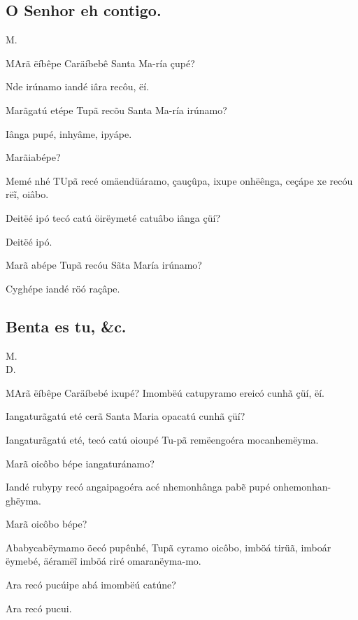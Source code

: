\documentclass[openany,titlepage,12pt]{book}
\newcommand{\comecalista}[5]{
    \hspace*{-11.7pt}
    \begin{minipage}[t]{0.08\linewidth}
        \flushright #1\\#2
    \end{minipage}
    \hspace{0pt}
    \begin{minipage}[t]{0.94\linewidth}
        \lettrine
        [findent =2pt, nindent=0pt,  lines=2]
        {#3}{#4}#5
    \end{minipage}
    \vspace*{-3pt}
}
\begin{document}
\subsection{O Senhor eh contigo.}
\vspace*{-2pt}
\comecalista{M.}{}{M}{A}
    {rã ëíbêpe Caräíbebê Santa Ma-ría çupé?}
\begin{altereven}
    \item Nde irúnamo iandé iâra recôu, ëí.
    \item Marãgatú etépe Tupã recõu Santa Ma-ría irúnamo?
    \item Iânga pupé, inhyâme, ipyápe.
    \item Marãiabépe?
    \item Memé nhé TUpã recé omäendüáramo, çauçûpa, ixupe
    onhëênga, ceçápe xe recóu rëĩ, oiâbo.
    \item Deitëé ipó tecó catú öirëymeté catuâbo iânga çüí?
    \item Deitëé ipó.
    \item Marã abépe Tupã recóu Sãta María irúnamo?
    \item Cyghépe iandé röó raçâpe.
\end{altereven}
\subsection{Benta es tu, \&c.}
\vspace*{-2pt}
\comecalista{M.}{D.}{M}{A}
    {rã ëíbêpe Caräíbebé ixupé?
    Imombëú catupyramo ereicó cunhã çüí, ëí.}
\begin{alternate}
    \item Iangaturãgatú eté cerã Santa Maria opacatú cunhã çüí?
    \item Iangaturãgatú eté, tecó catú oioupé Tu-pã
    remëengoéra mocanhemëyma.
    \item Marã oicôbo bépe iangaturánamo?
    \item Iandé rubypy recó angaipagoéra acé\linebreak
    nhemonhânga pabẽ pupé onhemonhan-ghëyma.
    \item Marã oicôbo bépe?
    \item Ababycabëymamo öecó pupênhé, Tupã cyramo 
    oicôbo, imböá tirüã, imboár ëymebé, äéramëĩ imböá riré
    omaranëyma-mo.
    \item Ara recó pucúipe abá imombëú catúne?
    \item Ara recó pucui.
\end{alternate}
\unskip\vspace*{-10pt}
\end{document}
